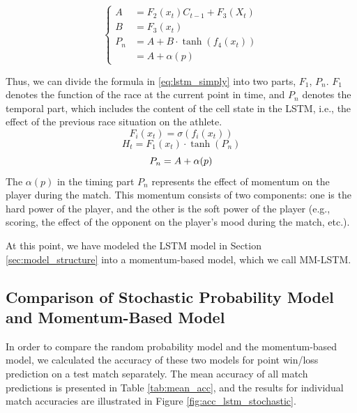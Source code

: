 \begin{equation}
\left\{
\begin{aligned}
    A &= F_2(x_t)C_{t-1}+F_3(X_t) \\
    B &= F_3(x_t) \\
    P_n &= A+B\cdot\tanh(f_4(x_t)) \\
    &= A+\alpha(p)
\end{aligned}
\right.
\end{equation}

Thus, we can divide the formula in \ref{eq:lstm_simply} into two parts, $F_1$, $P_n$. $F_1$ denotes the function of the race at the current point in time, and $P_n$ denotes the temporal part, which includes the content of the cell state in the LSTM, i.e., the effect of the previous race situation on the athlete.
\begin{equation}F_{i}(x_t)=\sigma(f_i(x_{t}))\end{equation}
\begin{equation}H_{t}=F_1(x_{t})\cdot\tanh(P_{n})\end{equation}
\begin{equation}
\label{ll}
P_n=A+\alpha(p)\\\end{equation}
The $\alpha(p)$ in the timing part $P_n$ represents the effect of momentum on the player during the match. This momentum consists of two components: one is the hard power of the player, and the other is the soft power of the player (e.g., scoring, the effect of the opponent on the player's mood during the match, etc.).

At this point, we have modeled the LSTM model in Section \ref{sec:model_structure} into a momentum-based model, which we call MM-LSTM.


\subsection{Comparison of Stochastic Probability Model and Momentum-Based Model}

In order to compare the random probability model and the momentum-based model, we calculated the accuracy of these two models for point win/loss prediction on a test match separately. The mean accuracy of all match predictions is presented in Table \ref{tab:mean_acc}, and the results for individual match accuracies are illustrated in Figure \ref{fig:acc_lstm_stochastic}.

